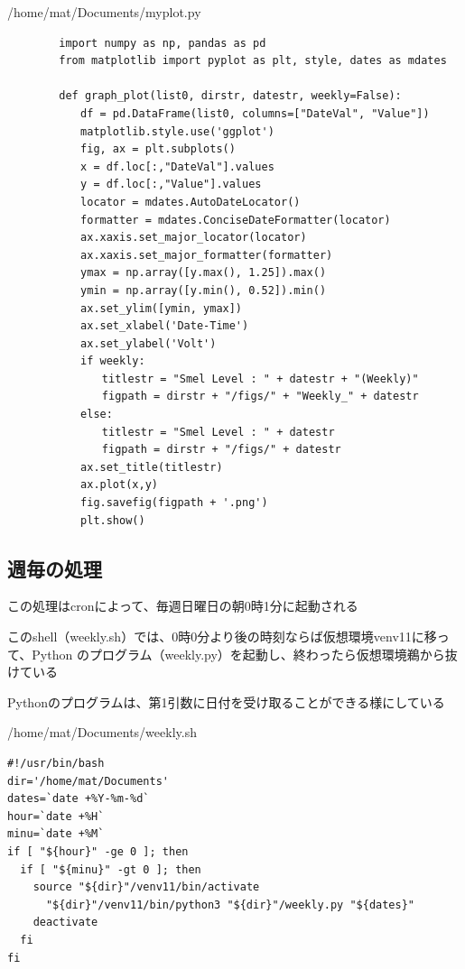 \documentclass[12pt,a4paper,uplatex]{jsarticle}
\begin{document}
\begin{itembox}[l]{/home/mat/Documents/myplot.py}
	\begin{verbatim}
		import numpy as np, pandas as pd
		from matplotlib import pyplot as plt, style, dates as mdates
		
		def graph_plot(list0, dirstr, datestr, weekly=False):
		　　df = pd.DataFrame(list0, columns=["DateVal", "Value"])
		　　matplotlib.style.use('ggplot')
		　　fig, ax = plt.subplots()
		　　x = df.loc[:,"DateVal"].values
		　　y = df.loc[:,"Value"].values
		　　locator = mdates.AutoDateLocator()
		　　formatter = mdates.ConciseDateFormatter(locator)
		　　ax.xaxis.set_major_locator(locator)
		　　ax.xaxis.set_major_formatter(formatter)
		　　ymax = np.array([y.max(), 1.25]).max()
		　　ymin = np.array([y.min(), 0.52]).min()
		　　ax.set_ylim([ymin, ymax])
		　　ax.set_xlabel('Date-Time')
		　　ax.set_ylabel('Volt')
		　　if weekly:
		　　　　titlestr = "Smel Level : " + datestr + "(Weekly)"
		　　　　figpath = dirstr + "/figs/" + "Weekly_" + datestr
		　　else:
		　　　　titlestr = "Smel Level : " + datestr
		　　　　figpath = dirstr + "/figs/" + datestr
		　　ax.set_title(titlestr)
		　　ax.plot(x,y)
		　　fig.savefig(figpath + '.png')
		　　plt.show()	
	\end{verbatim}
\end{itembox}

\newpage

\subsection{週毎の処理}

この処理はcronによって、毎週日曜日の朝0時1分に起動される

このshell（weekly.sh）では、0時0分より後の時刻ならば仮想環境venv11に移って、Python のプログラム（weekly.py）を起動し、終わったら仮想環境鵜から抜けている

Pythonのプログラムは、第1引数に日付を受け取ることができる様にしている

\begin{itembox}[l]{/home/mat/Documents/weekly.sh}
	\begin{verbatim}
#!/usr/bin/bash
dir='/home/mat/Documents'
dates=`date +%Y-%m-%d`
hour=`date +%H`
minu=`date +%M`
if [ "${hour}" -ge 0 ]; then
  if [ "${minu}" -gt 0 ]; then
    source "${dir}"/venv11/bin/activate
      "${dir}"/venv11/bin/python3 "${dir}"/weekly.py "${dates}"
    deactivate
  fi
fi
	\end{verbatim}
\end{itembox}
\end{document}

